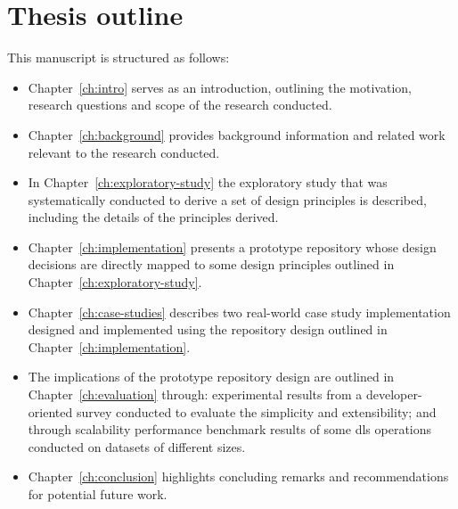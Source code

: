 \section{Thesis outline}
\label{sec:ch-intro:thesis-outline}


This manuscript is structured as follows:

\begin{itemize}
 \item Chapter~\ref{ch:intro} serves as an introduction, outlining the motivation, research questions and scope of the research conducted.
 \item Chapter~\ref{ch:background} provides background information and related work relevant to the research conducted.
 \item In Chapter~\ref{ch:exploratory-study} the exploratory study that was systematically conducted to derive a set of design principles is described, including the details of the principles derived.
 \item Chapter~\ref{ch:implementation} presents a prototype repository whose design decisions are directly mapped to some design principles outlined in Chapter~\ref{ch:exploratory-study}.
 \item Chapter~\ref{ch:case-studies} describes two real-world case study implementation designed and implemented using the repository design outlined in Chapter~\ref{ch:implementation}.
 \item The implications of the prototype repository design are outlined in Chapter~\ref{ch:evaluation} through: experimental results from a developer-oriented survey conducted to evaluate the simplicity and extensibility; and through scalability performance benchmark results of some \gls{dls} operations conducted on datasets of different sizes.
 \item Chapter~\ref{ch:conclusion} highlights concluding remarks and recommendations for potential future work.
\end{itemize}

